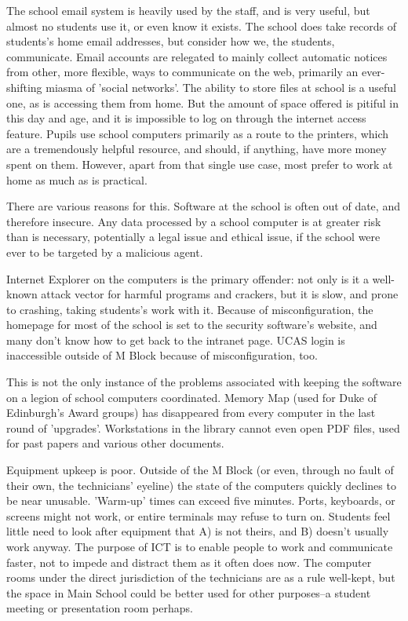 \documentclass[a4paper,leqno,titlepage]{article}
\begin{document}
The school email system is heavily used by the staff, and is very useful, but
almost no students use it, or even know it exists. The school does take records
of students's home email addresses, but consider how we, the students,
communicate. Email accounts are relegated to mainly collect automatic notices
from other, more flexible, ways to communicate on the web, primarily an
ever-shifting miasma of 'social networks'.
The ability to store files at school is a useful one, as is accessing them from
home. But the amount of space offered is pitiful in this day and age, and it is
impossible to log on through the internet access feature.
Pupils use school computers primarily as a route to the printers, which are a
tremendously helpful resource, and should, if anything, have more money spent on them.
However, apart from that single use case,
most prefer to work at home as much as is practical.

There are various reasons for this.
Software at the school is often out of date, and therefore insecure.
Any data processed by a school computer is at greater risk than is necessary,
potentially a legal issue and ethical issue, if the school were ever to be
targeted by a malicious agent.


Internet Explorer on the computers is the primary offender: not only is it
a well-known attack vector for harmful programs and crackers, but it is slow, and
prone to crashing, taking students's work with it. Because of misconfiguration,
the homepage for most of the school is set to the security software's website,
and many don't know how to get back to the intranet page. UCAS login is
inaccessible outside of M Block because of misconfiguration, too.


This is not the only instance of the problems associated with keeping the
software on a legion of school computers coordinated. Memory Map
(used for Duke of Edinburgh's Award groups) has disappeared from every computer
in the last round of 'upgrades'. Workstations in the library cannot even open
PDF files, used for past papers and various other documents.


Equipment upkeep is poor. Outside of the M Block (or even, through no fault of
their own, the technicians' eyeline) the state of the computers quickly declines
to be near unusable. 'Warm-up' times can exceed five minutes. Ports, keyboards,
or screens might not work, or entire terminals may refuse to turn on.
Students feel little need to look after equipment that A) is not theirs,
and B) doesn't usually work anyway. The purpose of ICT is to enable
people to work and communicate faster, not to impede and distract them as it
often does now. The computer rooms under the direct jurisdiction of the
technicians are as a rule well-kept, but the space in Main School could be
better used for other purposes--a student meeting or presentation room perhaps.
\end{document}
